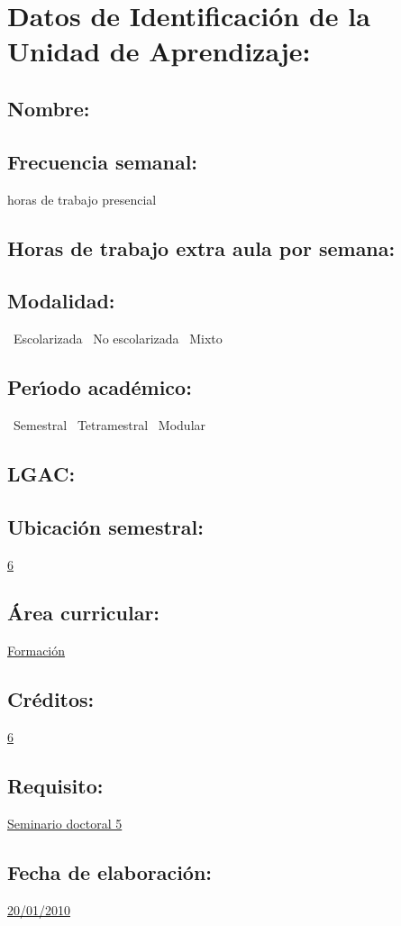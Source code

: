 \documentclass[10 pt]{article}
\begin{document}


\section{Datos de Identificaci\'{o}n de la Unidad de Aprendizaje:}
\subsection{Nombre:} 
\subsection{Frecuencia semanal:} horas de trabajo presencial 
\subsection{Horas de trabajo extra aula por semana:} 
\subsection{Modalidad:} \yes~Escolarizada \no~No escolarizada \no~Mixto
\subsection{Per\'{\i}odo acad\'{e}mico:} \yes~Semestral
\no~Tetramestral \no~Modular
\subsection{LGAC:} \underline{\odsi}
\subsection{Ubicaci\'{o}n semestral:} \underline{6}
\subsection{\'{A}rea curricular:} \underline{Formaci\'{o}n}
\subsection{Cr\'{e}ditos:} \underline{6}
\subsection{Requisito:} \underline{Seminario doctoral 5}
\subsection{Fecha de elaboraci\'{o}n:} \underline{20/01/2010}
\end{document}
